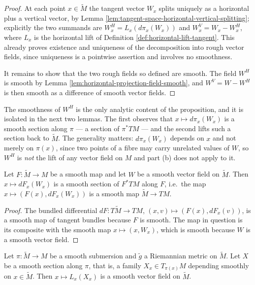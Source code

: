 \begin{proof}
\leanok
At each point $x \in \tilde{M}$ the tangent vector $W_x$ splits uniquely as a horizontal plus a vertical vector, by Lemma \ref{lem:tangent-space-horizontal-vertical-splitting}; explicitly the two summands are $W^H_x = L_x(d\pi_x(W_x))$ and $W^V_x = W_x - W^H_x$, where $L_x$ is the horizontal lift of Definition \ref{def:horizontal-lift-tangent}. This already proves existence and uniqueness of the decomposition into rough vector fields, since uniqueness is a pointwise assertion and involves no smoothness.

It remains to show that the two rough fields so defined are smooth. The field $W^H$ is smooth by Lemma \ref{lem:horizontal-projection-field-smooth}, and $W^V = W - W^H$ is then smooth as a difference of smooth vector fields.
\end{proof}

The smoothness of $W^H$ is the only analytic content of the proposition, and it is
isolated in the next two lemmas. The first observes that $x \mapsto d\pi_x(W_x)$ is
a smooth section along $\pi$ — a section of $\pi^* TM$ — and the second lifts such
a section back to $\tilde{M}$. The generality matters: $d\pi_x(W_x)$ depends on $x$
and not merely on $\pi(x)$, since two points of a fibre may carry unrelated values
of $W$, so $W^H$ is \emph{not} the lift of any vector field on $M$ and part (b)
does not apply to it.

\begin{lemma}
\label{lem:pushforward-along-map-smooth}
\leanok
{}
Let $F : \tilde{M} \to M$ be a smooth map and let $W$ be a smooth vector field on $\tilde{M}$. Then $x \mapsto dF_x(W_x)$ is a smooth section of $F^*TM$ along $F$, i.e.\ the map $x \mapsto (F(x), dF_x(W_x))$ is a smooth map $\tilde{M} \to TM$.
\end{lemma}

\begin{proof}
\leanok
The bundled differential $dF : T\tilde{M} \to TM$, $(x, v) \mapsto (F(x), dF_x(v))$, is a smooth map of tangent bundles because $F$ is smooth. The map in question is its composite with the smooth map $x \mapsto (x, W_x)$, which is smooth because $W$ is a smooth vector field.
\end{proof}

\begin{lemma}
\label{lem:horizontal-lift-along-smooth}
\leanok
{}
Let $\pi : \tilde{M} \to M$ be a smooth submersion and $\tilde{g}$ a Riemannian metric on $\tilde{M}$. Let $X$ be a smooth section along $\pi$, that is, a family $X_x \in T_{\pi(x)}M$ depending smoothly on $x \in \tilde{M}$. Then $x \mapsto L_x(X_x)$ is a smooth vector field on $\tilde{M}$.
\end{lemma}

